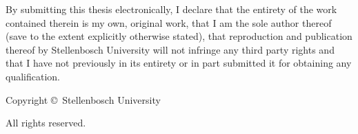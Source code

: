 
\begin{declaration}

By submitting this thesis electronically, I declare that the entirety of the work contained therein is my own, original work, that I am the sole author thereof (save to
the extent explicitly otherwise stated), that reproduction and publication thereof by
Stellenbosch University will not infringe any third party rights and that I have not
previously in its entirety or in part submitted it for obtaining any qualification.


\end{declaration}

\null\vfill
\noindent
Copyright \copyright \the\year\ Stellenbosch University \par
\noindent All rights reserved.
\newpage